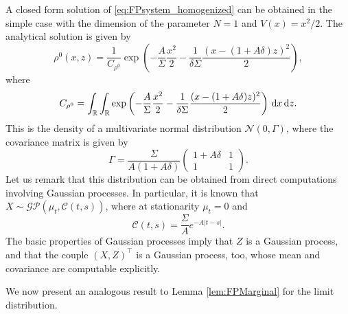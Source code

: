 \documentclass[10pt]{article}
\begin{document}
\begin{example}\label{ex:OrnUhl} A closed form solution of \eqref{eq:FPsystem_homogenized} can be obtained in the simple case with the dimension of the parameter $N=1$ and $V(x) = x^2/2$. The analytical solution is given by
	\begin{equation}
	\rho^0(x,z) = \frac{1}{C_{\rho^0}} \exp\left(-\frac{A}{\Sigma} \frac{x^2}{2} - \frac{1}{\delta \Sigma} \frac{(x - (1+A \delta)z)^2}{2}\right),
	\end{equation}
	where
	\begin{equation}
	C_{\rho^0} = \int_{\mathbb{R}} \int_{\mathbb{R}} \exp\left(-\frac{A}{\Sigma} \frac{x^2}{2} - \frac{1}{\delta \Sigma} \frac{(x - (1+A \delta)z)^2}{2}\right) \,\mathrm{d} x \,\mathrm{d} z.
	\end{equation}
	This is the density of a multivariate normal distribution $\mathcal N(0, \Gamma)$, where the covariance matrix is given by
	\begin{equation}
	\Gamma = \frac{\Sigma}{A (1 + A\delta)} \begin{pmatrix} 1+A\delta & 1 \\ 1 & 1 \end{pmatrix}.
	\end{equation}
	Let us remark that this distribution can be obtained from direct computations involving Gaussian processes. In particular, it is known that $X \sim \mathcal{GP}(\mu_t, \mathcal C(t, s))$, where at stationarity $\mu_t = 0$ and
	\begin{equation}
	\mathcal C(t, s) = \frac{\Sigma}{A} e^{-A|t-s|}.
	\end{equation}
	The basic properties of Gaussian processes imply that $Z$ is a Gaussian process, and that the couple $(X, Z)^\top$ is a Gaussian process, too, whose mean and covariance are computable explicitly.
\end{example}

We now present an analogous result to Lemma \ref{lem:FPMarginal} for the limit distribution.
\end{document}

